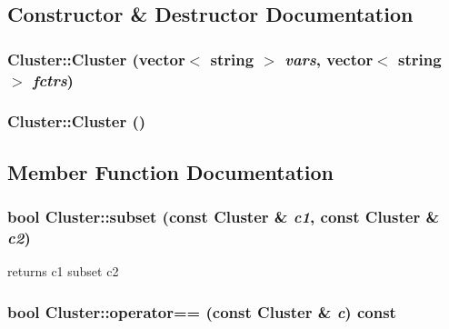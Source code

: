 \subsection{Constructor \& Destructor Documentation}
\subsubsection{\setlength{\rightskip}{0pt plus 5cm}Cluster::Cluster (vector$<$ string $>$ {\em vars}, vector$<$ string $>$ {\em fctrs})\hspace{0.3cm}{\tt  [inline]}}\label{structCluster_2a24a407dd0ed35b92ba5a152bc908a0}


\subsubsection{\setlength{\rightskip}{0pt plus 5cm}Cluster::Cluster ()\hspace{0.3cm}{\tt  [inline]}}\label{structCluster_bf2af19044d4b84b9c9eb4f723453139}




\subsection{Member Function Documentation}
\subsubsection{\setlength{\rightskip}{0pt plus 5cm}bool Cluster::subset (const {\bf Cluster} \& {\em c1}, const {\bf Cluster} \& {\em c2})\hspace{0.3cm}{\tt  [static]}}\label{structCluster_7b0d5c799fcd34dfeda18800f73b340e}


returns c1 subset c2 

\subsubsection{\setlength{\rightskip}{0pt plus 5cm}bool Cluster::operator== (const {\bf Cluster} \& {\em c}) const\hspace{0.3cm}{\tt  [inline]}}\label{structCluster_2daa42739b49a758a8f0a7865e4d213e}


